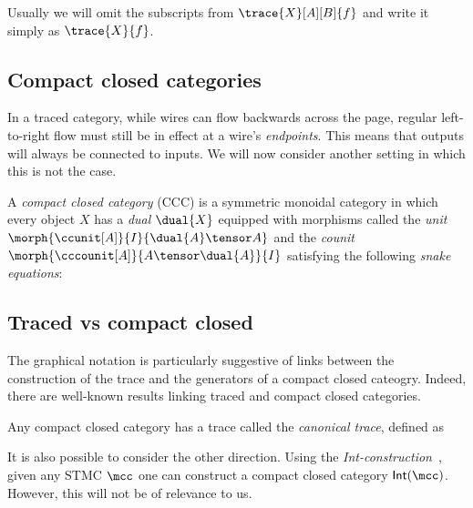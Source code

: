 Usually we will omit the subscripts from \(\trace{X}[A][B]{f}\) and write it
simply as \(\trace{X}{f}\).



\subsection{Compact closed categories}

In a traced category, while wires can flow backwards across the page, regular
left-to-right flow must still be in effect at a wire's \emph{endpoints}.
This means that outputs will always be connected to inputs.
We will now consider another setting in which this is not the case.

\begin{definition}
    A \emph{compact closed category} (CCC) is a symmetric monoidal category in
    which every object \(X\) has a \emph{dual} \(\dual{X}\) equipped with
    morphisms called the \emph{unit} \(
        \morph{\ccunit[A]}{I}{\dual{A} \tensor A}
    \) and the \emph{counit} \(
        \morph{\cccounit[A]}{A \tensor \dual{A}}{I}
    \) satisfying the following \emph{snake equations}:
    \begin{center}
        
        \quad
        
    \end{center}
\end{definition}

\begin{definition}

\end{definition}

\subsection{Traced vs compact closed}

The graphical notation is particularly suggestive of links between the
construction of the trace and the generators of a compact closed cateogry.
Indeed, there are well-known results linking traced and compact closed
categories.

\begin{proposition}
    \label{prop:canonical-trace}
    Any compact closed category has a trace called the \emph{canonical trace},
    defined as
\end{proposition}

\begin{remark}
    It is also possible to consider the other direction.
    Using the \emph{Int-construction}~\cite{joyal1996traced}, given any STMC
    \(\mcc\) one can construct a compact closed category \(\mathsf{Int}(\mcc)\).
    However, this will not be of relevance to us.
\end{remark}